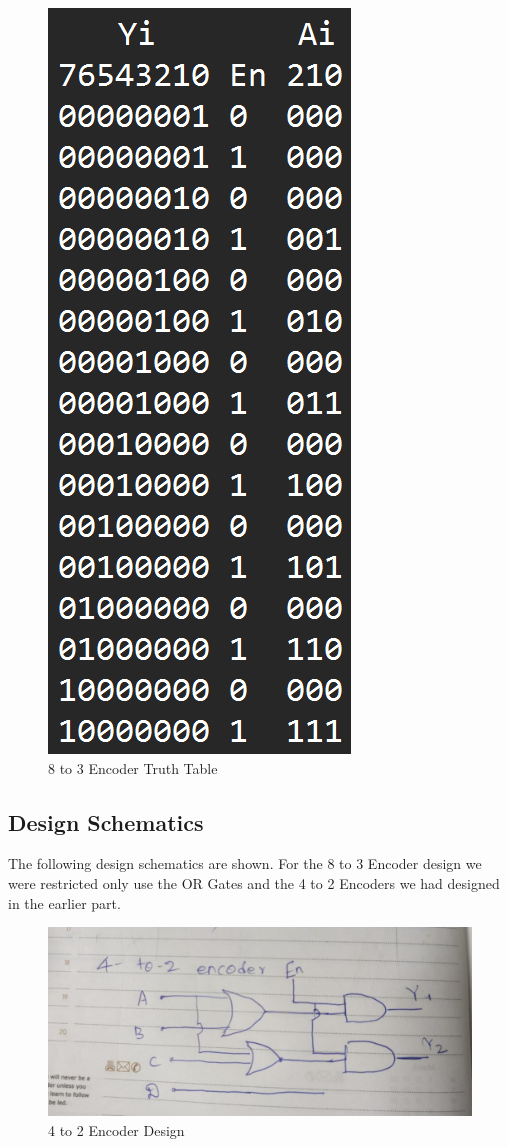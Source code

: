 \documentclass[12pt]{article}
\begin{document}
\begin{figure}[H]
\centering
  \includegraphics[scale=0.3]{Images/8to3TT.png}
  \caption{8 to 3 Encoder Truth Table}
\end{figure}

\subsection{Design Schematics}
The following design schematics are shown. For the 8 to 3 Encoder design we were restricted only use the OR Gates and the 4 to 2 Encoders we had designed in the earlier part. 

\begin{figure}[H]
\centering
  \includegraphics[scale=0.3]{Images/4to2ENCODER_DESIGN.png}
  \caption{4 to 2 Encoder Design}
\end{figure}
\end{document}
